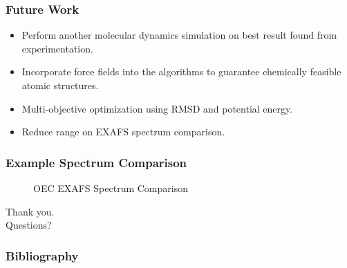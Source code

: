 \documentclass[10pt]{beamer}
\begin{document}
\begin{frame}
	\frametitle{Future Work}

	\begin{itemize}
		\item Perform another molecular dynamics simulation on best result found from experimentation.
		\item Incorporate force fields into the algorithms to guarantee chemically feasible atomic structures.
		\item Multi-objective optimization using RMSD and potential energy.
		\item Reduce range on EXAFS spectrum comparison.
	\end{itemize}

\end{frame}

\begin{frame}
	\frametitle{Example Spectrum Comparison}

	\begin{figure}
		\caption{OEC EXAFS Spectrum Comparison}
	\end{figure}

\end{frame}

\begin{frame}
	
	\begin{center}
	\Huge Thank you.
	\\
	\Huge Questions?
	\end{center}

\end{frame}

\begin{frame}
	\frametitle{Bibliography}

	
	

\end{frame}
\end{document}
